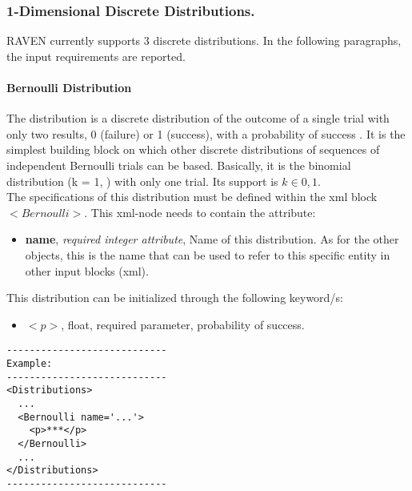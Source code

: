 \subsubsection{1-Dimensional Discrete Distributions.}
\label{subsubsec:1DDiscrete}
RAVEN currently supports 3 discrete distributions. In the following paragraphs, the input requirements are reported.
\paragraph{Bernoulli Distribution}
\label{Bernoulli}
The  distribution is a discrete distribution of the outcome of a single trial with only two results, 0 (failure) or 1 (success), with a probability of success . It is the simplest building block on which other discrete distributions of sequences of independent Bernoulli trials can be based. Basically, it is the binomial distribution (k = 1, ) with only one trial.  Its support is $k \in {0, 1}$.
\\ The specifications of this distribution must be defined within the xml block $<Bernoulli>$. This xml-node needs to contain the attribute:
\vspace{-5mm}
\begin{itemize}
\itemsep0em
\item \textbf{name}, \textit{required integer attribute}, Name of this distribution. As for the other objects, this is the name that can be used to refer to this specific entity in other input blocks (xml).   
\end{itemize}
\vspace{-5mm}
This distribution can be initialized through the following keyword/s:
\begin{itemize}
\item $<p>$, float, required parameter, probability of success.
 \end{itemize}
\begin{lstlisting}[style=XML]
----------------------------
Example:
----------------------------
<Distributions>
  ...
  <Bernoulli name='...'>
    <p>***</p>
  </Bernoulli>
  ...
</Distributions>
----------------------------
\end{lstlisting}

